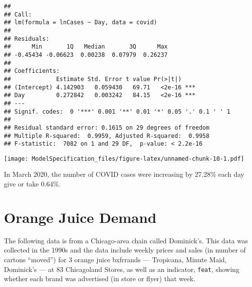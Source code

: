 \documentclass[
]{article}
\newenvironment{Shaded}{\begin{snugshade}}{\end{snugshade}}
\newcommand{\AttributeTok}[1]{\textcolor[rgb]{0.13,0.29,0.53}{#1}}
\newcommand{\FunctionTok}[1]{\textcolor[rgb]{0.13,0.29,0.53}{\textbf{#1}}}
\newcommand{\NormalTok}[1]{#1}
\newcommand{\OtherTok}[1]{\textcolor[rgb]{0.56,0.35,0.01}{#1}}
\newcommand{\SpecialCharTok}[1]{\textcolor[rgb]{0.81,0.36,0.00}{\textbf{#1}}}
\newcommand{\StringTok}[1]{\textcolor[rgb]{0.31,0.60,0.02}{#1}}
\begin{document}
\begin{verbatim}
## 
## Call:
## lm(formula = lnCases ~ Day, data = covid)
## 
## Residuals:
##      Min       1Q   Median       3Q      Max 
## -0.45434 -0.06623  0.00238  0.07979  0.26237 
## 
## Coefficients:
##             Estimate Std. Error t value Pr(>|t|)    
## (Intercept) 4.142903   0.059430   69.71   <2e-16 ***
## Day         0.272842   0.003242   84.15   <2e-16 ***
## ---
## Signif. codes:  0 '***' 0.001 '**' 0.01 '*' 0.05 '.' 0.1 ' ' 1
## 
## Residual standard error: 0.1615 on 29 degrees of freedom
## Multiple R-squared:  0.9959, Adjusted R-squared:  0.9958 
## F-statistic:  7082 on 1 and 29 DF,  p-value: < 2.2e-16
\end{verbatim}

\begin{Shaded}
\end{Shaded}

\texttt{[image: ModelSpecification\_files/figure-latex/unnamed-chunk-10-1.pdf]}

In March 2020, the number of COVID cases were increasing by 27.28\% each
day give or take 0.64\%.

\section{Orange Juice Demand}\label{orange-juice-demand}

The following data is from a Chicago-area chain called Dominick's. This
data was collected in the 1990s and the data include weekly prices and
sales (in number of cartons ``moved'') for 3 orange juice bxfrrands ---
Tropicana, Minute Maid, Dominick's --- at 83 Chicagoland Stores, as well
as an indicator, \texttt{feat}, showing whether each brand was
advertised (in store or flyer) that week.
\end{document}
